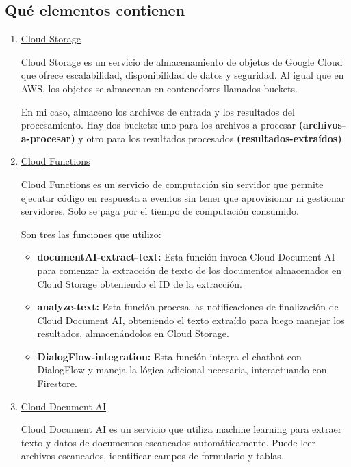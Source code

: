 \subsection{Qué elementos contienen}\label{elementos-gcp}
\begin{enumerate}

    \item \underline{Cloud Storage}
    
    Cloud Storage es un servicio de almacenamiento de objetos de Google Cloud que ofrece escalabilidad, disponibilidad de datos y seguridad. Al igual que en AWS, los objetos se almacenan en contenedores llamados buckets. 
    
    En mi caso, almaceno los archivos de entrada y los resultados del procesamiento. Hay dos buckets: uno para los archivos a procesar \textbf{(archivos-a-procesar)} y otro para los resultados procesados \textbf{(resultados-extraídos)}.
    
    \item \underline{Cloud Functions}
    
    Cloud Functions es un servicio de computación sin servidor que permite ejecutar código en respuesta a eventos sin tener que aprovisionar ni gestionar servidores. Solo se paga por el tiempo de computación consumido. 
    
    Son tres las funciones que utilizo:
    \begin{itemize}
        \item \textbf{documentAI-extract-text:} Esta función invoca Cloud Document AI para comenzar la extracción de texto de los documentos almacenados en Cloud Storage obteniendo el ID de la extracción.
        \item \textbf{analyze-text:} Esta función procesa las notificaciones de finalización de Cloud Document AI, obteniendo el texto extraído para luego manejar los resultados, almacenándolos en Cloud Storage.
        \item \textbf{DialogFlow-integration:} Esta función integra el chatbot con DialogFlow y maneja la lógica adicional necesaria, interactuando con Firestore.
    \end{itemize}
    
    \item \underline{Cloud Document AI}
    
    Cloud Document AI es un servicio que utiliza machine learning para extraer texto y datos de documentos escaneados automáticamente. Puede leer archivos escaneados, identificar campos de formulario y tablas.
    

\end{enumerate}

